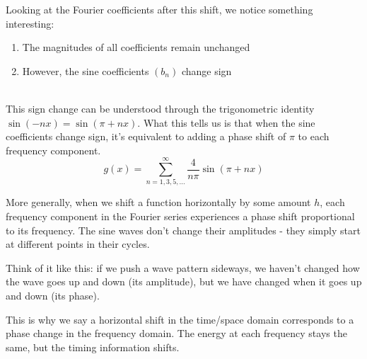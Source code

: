 \documentclass{article}
\begin{document}
Looking at the Fourier coefficients after this shift, we notice something interesting:

\begin{enumerate}
\item The magnitudes of all coefficients remain unchanged
\item However, the sine coefficients $(b_n)$ change sign
\end{enumerate}\\

This sign change can be understood through the trigonometric identity $\sin(-nx) = \sin(\pi + nx)$. What this tells us is that when the sine coefficients change sign, it's equivalent to adding a phase shift of $\pi$ to each frequency component.
\begin{equation}
g(x) = \sum_{n=1,3,5,...}^{\infty} \frac{4}{n\pi} \sin\left(\pi+nx\right)
\end{equation}

More generally, when we shift a function horizontally by some amount $h$, each frequency component in the Fourier series experiences a phase shift proportional to its frequency. The sine waves don't change their amplitudes - they simply start at different points in their cycles.
\vspace{0.2in}

Think of it like this: if we push a wave pattern sideways, we haven't changed how the wave goes up and down (its amplitude), but we have changed when it goes up and down (its phase).
\vspace{0.2in}

This is why we say a horizontal shift in the time/space domain corresponds to a phase change in the frequency domain. The energy at each frequency stays the same, but the timing information shifts.
\end{document}
